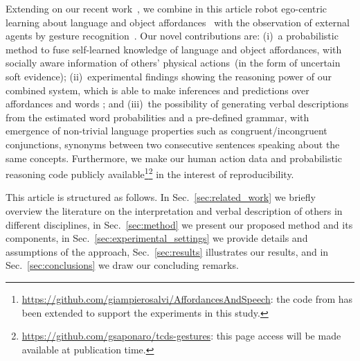 Extending on our recent work~\cite{saponaro:2017:glu}, we combine in this article robot ego-centric learning about language and object affordances~\cite{salvi:2012:smcb} with the observation of external agents by gesture recognition~\cite{saponaro:2013:crhri}.
Our novel contributions are:
(i)~a probabilistic method to fuse self-learned knowledge of language and object affordances, with socially aware information of others' physical actions~(in the form of uncertain soft evidence);
(ii)~experimental findings showing the reasoning power of our combined system, which is able to make inferences and predictions over affordances and words%
; and
(iii)~the possibility of generating verbal descriptions from the estimated word probabilities and a pre-defined grammar, with emergence of non-trivial language properties such as congruent/incongruent conjunctions, synonyms between two consecutive sentences speaking about the same concepts.
Furthermore, we make our human action data and probabilistic reasoning code publicly available\footnote{\url{https://github.com/giampierosalvi/AffordancesAndSpeech}: the code from \cite{salvi:2012:smcb} has been extended to support the experiments in this study.}\footnote{\url{https://github.com/gsaponaro/tcds-gestures}: this page access will be made available at publication time.} in the interest of reproducibility.

This article is structured as follows.
In Sec.~\ref{sec:related_work} we briefly overview the literature on the interpretation and verbal description of others in different disciplines,
in Sec.~\ref{sec:method} we present our proposed method and its components,
in Sec.~\ref{sec:experimental_settings} we provide details and assumptions of the approach,
Sec.~\ref{sec:results} illustrates our results, and
in Sec.~\ref{sec:conclusions} we draw our concluding remarks.

